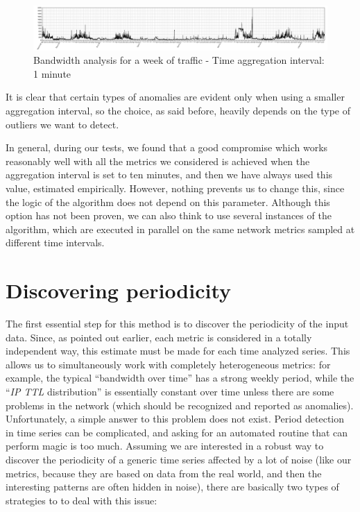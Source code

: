 \documentclass[12pt,a4paper,cucitura]{toptesi}
\begin{document}
\begin{figure}
\centering
\includegraphics[width=\textwidth]{bw1min.png}
\caption{Bandwidth analysis for a week of traffic - Time aggregation interval: 1 minute}
\end{figure}

It is clear that certain types of anomalies are evident only when using a smaller aggregation interval, so the choice, as said before, heavily depends on the type of outliers we want to detect.

In general, during our tests, we found that a good compromise which works reasonably well with all the metrics we considered is achieved when the aggregation interval is set to ten minutes, and then we have always used this value, estimated empirically.
However, nothing prevents us to change this, since the logic of the algorithm does not depend on this parameter.
Although this option has not been proven, we can also think to use several instances of the algorithm, which are executed in parallel on the same network metrics sampled at different time intervals.

\section{Discovering periodicity}

The first essential step for this method is to discover the periodicity of the input data.
Since, as pointed out earlier, each metric is considered in a totally independent way, this estimate must be made for each time analyzed series.
This allows us to simultaneously work with completely heterogeneous metrics: for example, the typical ``bandwidth over time'' has a strong weekly period, while the ``\emph{IP TTL} distribution'' is essentially constant over time unless there are some problems in the network (which should be recognized and reported as anomalies).
Unfortunately, a simple answer to this problem does not exist. Period detection in time series can be complicated, and asking for an automated routine that can perform magic is too much.
Assuming we are interested in a robust way to discover the periodicity of a generic time series affected by a lot of noise (like our metrics, because they are based on data from the real world, and then the interesting patterns are often hidden in noise), there are basically two types of strategies to to deal with this issue:
\end{document}
